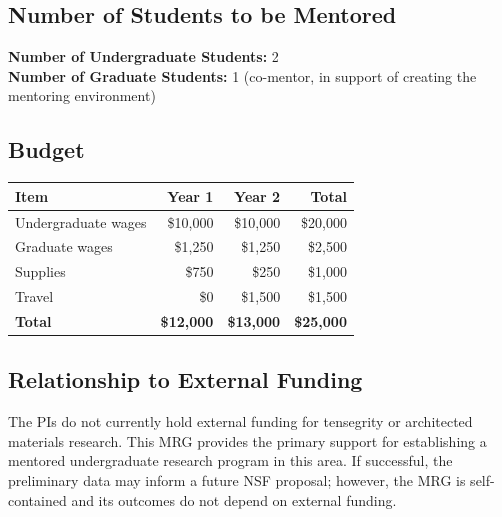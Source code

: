 \subsection*{Number of Students to be Mentored}
\textbf{Number of Undergraduate Students:} 2 \\
\textbf{Number of Graduate Students:} 1 (co-mentor, in support of creating the mentoring environment)

\subsection*{Budget}

\vspace{-0.5em}
\begin{center}
\begin{tabular}{@{}lrrr@{}}
\toprule
\textbf{Item} & \textbf{Year 1} & \textbf{Year 2} & \textbf{Total} \\
\midrule
Undergraduate wages    & \$10,000 & \$10,000 & \$20,000 \\
Graduate wages         & \$1,250  & \$1,250  & \$2,500  \\
Supplies               & \$750    & \$250    & \$1,000  \\
Travel                 & \$0      & \$1,500  & \$1,500  \\
\midrule
\textbf{Total}         & \textbf{\$12,000} & \textbf{\$13,000} & \textbf{\$25,000} \\
\bottomrule
\end{tabular}
\end{center}
\vspace{-0.5em}

\subsection*{Relationship to External Funding}

The PIs do not currently hold external funding for tensegrity or architected
materials research.  This MRG provides the primary support for establishing a
mentored undergraduate research program in this area.  If successful, the
preliminary data may inform a future NSF proposal; however, the MRG is
self-contained and its outcomes do not depend on external funding.

\endgroup
\newpage

